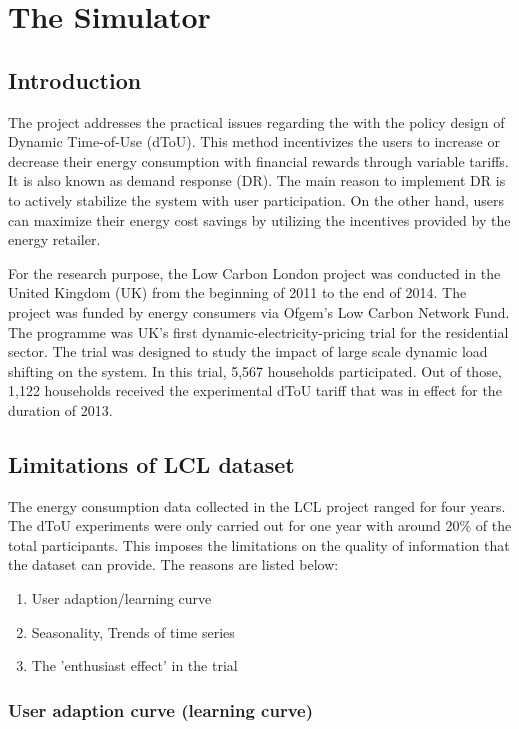 \chapter{The Simulator}

\section{Introduction}

The project addresses the practical issues regarding the with the policy design of Dynamic Time-of-Use (dToU). This method incentivizes the users to increase or decrease their energy consumption with financial rewards through variable tariffs. It is also known as demand response (DR). The main reason to implement DR is to actively stabilize the system with user participation. On the other hand, users can maximize their energy cost savings by utilizing the incentives provided by the energy retailer.

For the research purpose, the Low Carbon London project was conducted in the United Kingdom (UK) from the beginning of 2011 to the end of 2014. The project was funded by energy consumers via Ofgem's Low Carbon Network Fund. The programme was UK's first dynamic-electricity-pricing trial for the residential sector. The trial was designed to study the impact of large scale dynamic load shifting on the system. In this trial, 5,567 households participated. Out of those, 1,122 households received the experimental dToU tariff that was in effect for the duration of 2013.

\section{Limitations of LCL dataset}
\label{limits-lcl}
The energy consumption data collected in the LCL project ranged for four years. The dToU experiments were only carried out for one year with around 20\% of the total participants. This imposes the limitations on the quality of information that the dataset can provide. The reasons are listed below:

\begin{enumerate}
    \item User adaption/learning curve
    \item Seasonality, Trends of time series
    \item The 'enthusiast effect' in the trial
\end{enumerate}

\subsection{User adaption curve (learning curve)}
\label{learning-curve}

